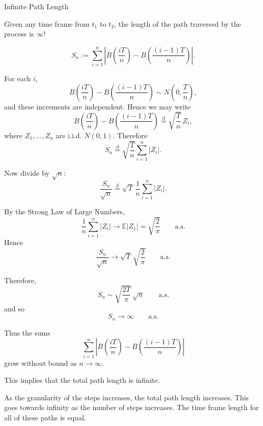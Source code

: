 \documentclass{beamer}
\begin{document}
	\begin{frame}{Infinite Path Length}
		
		Given any time frame from $t_1$ to $t_2$, the length of the path traversed by the process is $\infty$!
		
		\[
		S_n:=\sum_{i=1}^n \left|B\!\left(\frac{iT}{n}\right)-B\!\left(\frac{(i-1)T}{n}\right)\right|.
		\]
		
		For each \(i\),
		\[
		B\!\left(\frac{iT}{n}\right)-B\!\left(\frac{(i-1)T}{n}\right)\sim N\!\left(0,\frac{T}{n}\right),
		\]
		and these increments are independent. Hence we may write
		\[
		B\!\left(\frac{iT}{n}\right)-B\!\left(\frac{(i-1)T}{n}\right)
		\overset{d}{=}
		\sqrt{\frac{T}{n}}\,Z_i,
		\]
		where \(Z_1,\dots,Z_n\) are i.i.d. \(N(0,1)\). Therefore
		\[
		S_n
		\overset{d}{=}
		\sqrt{\frac{T}{n}}\sum_{i=1}^n |Z_i|.
		\]
	\end{frame}
	\begin{frame}
		Now divide by \(\sqrt{n}\):
		\[
		\frac{S_n}{\sqrt{n}}
		\overset{d}{=}
		\sqrt{T}\,\frac{1}{n}\sum_{i=1}^n |Z_i|.
		\]
		
		By the Strong Law of Large Numbers,
		\[
		\frac{1}{n}\sum_{i=1}^n |Z_i|
		\to \mathbb{E}|Z_1|
		=
		\sqrt{\frac{2}{\pi}}
		\qquad\text{a.s.}
		\]
		Hence
		\[
		\frac{S_n}{\sqrt{n}}
		\to
		\sqrt{T}\,\sqrt{\frac{2}{\pi}}
		\qquad\text{a.s.}
		\]
		
		Therefore,
		\[
		S_n \sim \sqrt{\frac{2T}{\pi}}\,\sqrt{n}
		\qquad\text{a.s.}
		\]
		and so
		\[
		S_n\to\infty
		\qquad\text{a.s.}
		\]
		
	\end{frame}
	
	\begin{frame}
		Thus the sums
		\[
		\sum_{i=1}^n \left|B\!\left(\frac{iT}{n}\right)-B\!\left(\frac{(i-1)T}{n}\right)\right|
		\]
		grow without bound as \(n\to\infty\).
		
		This implies that the total path length is infinite. 
	\end{frame}
	
	\begin{frame}
		\begin{figure}
			\centering
			\label{fig:placeholder}
		\end{figure}
		As the granularity of the steps increases, the total path length increases. This goes towards infinity as the number of steps increases. The time frame length for all of these paths is equal.
	\end{frame}
\end{document}
